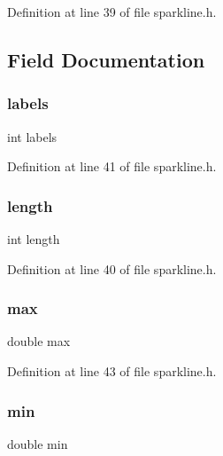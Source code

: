 Definition at line 39 of file sparkline.\+h.



\subsection{Field Documentation}
\mbox{\label{structsequence_a26e3b3147137397b7783e99e49618692}} 
\subsubsection{\texorpdfstring{labels}{labels}}
{\footnotesize\ttfamily int labels}



Definition at line 41 of file sparkline.\+h.

\mbox{\label{structsequence_a9f59b34b1f25fe00023291b678246bcc}} 
\subsubsection{\texorpdfstring{length}{length}}
{\footnotesize\ttfamily int length}



Definition at line 40 of file sparkline.\+h.

\mbox{\label{structsequence_a0b0ede69e8156eb97acc579b88e883de}} 
\subsubsection{\texorpdfstring{max}{max}}
{\footnotesize\ttfamily double max}



Definition at line 43 of file sparkline.\+h.

\mbox{\label{structsequence_aad36546e8175d2922bee165fe028fedc}} 
\subsubsection{\texorpdfstring{min}{min}}
{\footnotesize\ttfamily double min}



